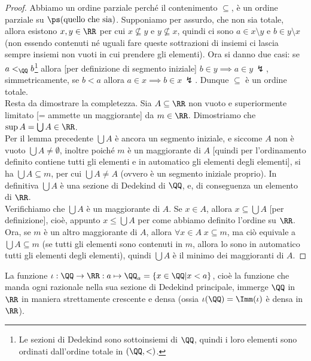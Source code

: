 \documentclass[11pt]{scrartcl}
\begin{document}
\begin{proof}
	Abbiamo un ordine parziale perché il contenimento $\subseteq$, è un ordine parziale su $\ps(\text{quello che sia})$. Supponiamo per assurdo, che non sia totale, allora esistono $x,y \in \RR$ per cui $x \not\subseteq y$ e 
	$y \not\subseteq x$, quindi ci sono $a \in x \setminus y$ e $b \in y \setminus x$ (non essendo contenuti né uguali fare queste sottrazioni di insiemi ci lascia sempre insiemi non vuoti in cui prendere gli elementi).
	Ora si danno due casi: se $a <_{\QQ} b$\footnote{Le sezioni di Dedekind sono sottoinsiemi di $\QQ$, quindi i loro elementi sono ordinati dall'ordine totale in $(\QQ,<)$.} allora [per definizione di segmento iniziale] $b \in y \implies a \in y \,\lightning$, simmetricamente, se $b < a$ allora $a \in x \implies b \in x \, \lightning$. Dunque $\subseteq$ è un ordine totale.\\
	Resta da dimostrare la completezza. Sia $A \subseteq \RR$ non vuoto e superiormente limitato [= ammette un maggiorante] da $m \in \RR$. Dimostriamo che $\sup A = \bigcup A \in \RR$.\\
	Per il lemma precedente $\bigcup A$ è ancora un segmento iniziale, e siccome $A$ non è vuoto $\bigcup A \ne \emptyset$, inoltre poiché $m$ è un maggiorante di $A$ [quindi per l'ordinamento definito contiene tutti gli elementi e in automatico gli elementi degli elementi], si ha $\bigcup A \subseteq m$, per cui $\bigcup A \ne A$ (ovvero è un segmento iniziale proprio).
	In definitiva $\bigcup A$ è una sezione di Dedekind di $\QQ$, e, di conseguenza un elemento di $\RR$.\\
	Verifichiamo che $\bigcup A$ è un maggiorante di $A$. Se $x \in A$, allora $x \subseteq \bigcup A$ [per definizione], cioè, appunto $x \leq \bigcup A$ per come abbiamo definito l'ordine su $\RR$.\\
	Ora, se $m$ è un altro maggiorante di $A$, allora $\forall x \in A \; x \subseteq m$, ma ciò equivale a $\bigcup A \subseteq m$ (se tutti gli elementi sono contenuti in $m$, allora lo sono in automatico tutti gli elementi degli elementi), quindi $\bigcup A$ è il minimo dei maggioranti di $A$.
\end{proof}

\begin{remark}
	La funzione $\iota : \QQ \rightarrow \RR : a \mapsto \QQ_a = \{x \in \QQ | x < a\}$, cioè la funzione che manda ogni razionale nella sua sezione di Dedekind principale, immerge $\QQ$ in $\RR$ in maniera strettamente
	crescente e densa (ossia $\iota(\QQ) = \Imm(\iota)$ è densa in $\RR$).
\end{remark}
\end{document}
